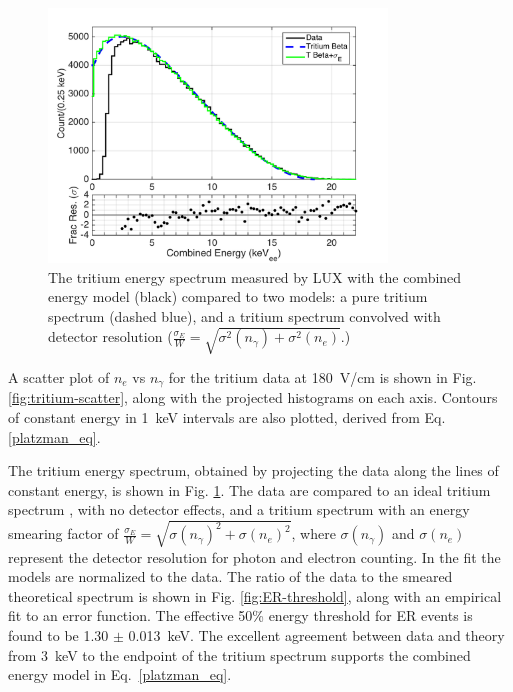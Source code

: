 \begin{figure}[h!]
\begin{center}
\includegraphics[width=90mm]{fig/tritium-spectrum-linear.png}
\caption{The tritium energy spectrum measured by LUX with the combined energy model (black) compared to two models: a pure tritium spectrum (dashed blue), and a tritium spectrum convolved with detector resolution  ($\frac{\sigma_E}{W} = \sqrt{\sigma^2(n_{\gamma})+ \sigma^2(n_e)}$.) }
\label{fig:tritium-spectrum}
\end{center}
\end{figure}


A scatter plot of $n_e$ vs $n_{\gamma}$ for the tritium data at 180~V/cm is shown in Fig. \ref{fig:tritium-scatter}, along with the projected histograms on each axis. Contours of constant energy in 1~keV intervals are also plotted, derived from Eq. \ref{platzman_eq}. 

The tritium energy spectrum, obtained by projecting the data along the lines of constant energy, is shown in Fig. \ref{fig:tritium-spectrum}. The data are compared to an ideal tritium spectrum \cite{Tritium_Eq_Simpson}, with no detector effects, and a tritium spectrum with an energy smearing factor of $ \frac{\sigma_E}{W} = \sqrt{\sigma(n_{\gamma})^2 + \sigma(n_e)^2}$, where $ \sigma(n_{\gamma})$ and $ \sigma(n_e)$ represent the detector resolution for photon and electron counting. In the fit the models are normalized to the data. The ratio of the data to the smeared theoretical spectrum is shown in Fig. \ref{fig:ER-threshold}, along with an empirical fit to an error function. The effective 50\% energy threshold for ER events is found to be 1.30 $\pm$ 0.013~keV. The excellent agreement between data and theory from 3~keV to the endpoint of the tritium spectrum supports the combined energy model in Eq.~\ref{platzman_eq}.


